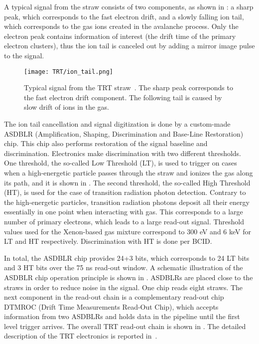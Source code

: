 A typical signal from the straw consists of two components, as shown in : 
a sharp peak, which corresponds to the fast electron drift, and a slowly falling ion tail, which corresponds to the gas ions created in the avalanche process.
Only the electron peak contains information of interest (the drift time of the primary electron clusters), thus the ion tail is canceled out by adding a mirror image pulse to the signal.

\begin{figure}
\centering
\texttt{[image: TRT/ion\_tail.png]}
\caption{ 
 Typical signal from the TRT straw~\cite{ID_TDR_vol2}. The sharp peak corresponds to the fast electron drift component.
 The following tail is caused by slow drift of ions in the gas.
}
\label{fig:ion_tail}
\end{figure}

The ion tail cancellation and signal digitization is done by a custom-made ASDBLR (Amplification, Shaping, Discrimination and Base-Line Restoration) chip. 
This chip also performs restoration of the signal baseline and discrimination. 
Electronics make discrimination with two different thresholds. One threshold, the so-called Low Threshold (LT), 
is used to trigger on cases when a high-energetic particle passes through the straw and ionizes the gas along its path, and it is shown in .
The second threshold, the so-called High Threshold (HT), is used for the case of transition radiation photon detection.
Contrary to the high-energetic particles, transition radiation photons deposit all their energy essentially in one point when interacting with gas.
This corresponds to a large number of primary electrons, which leads to a large read-out signal.
Threshold values used for the Xenon-based gas mixture correspond to 300 eV and 6 keV for LT and HT respectively.
Discrimination with HT is done per BCID. 

In total, the ASDBLR chip provides 24+3 bits, which corresponds to 24 LT bits and 3 HT bits over the 75 ns read-out window.
A schematic illustration of the ASDBLR chip operation principle is shown in .
ASDBLRs are placed close to the straws in order to reduce noise in the signal. One chip reads eight straws.
The next component in the read-out chain is a complementary read-out chip DTMROC (Drift Time Measurements Read-Out Chip), which accepts 
information from two ASDBLRs and holds data in the pipeline until the first level trigger arrives. 
The overall TRT read-out chain is shown in . The detailed description of the TRT electronics is reported in~\cite{TRT_electronics}.


